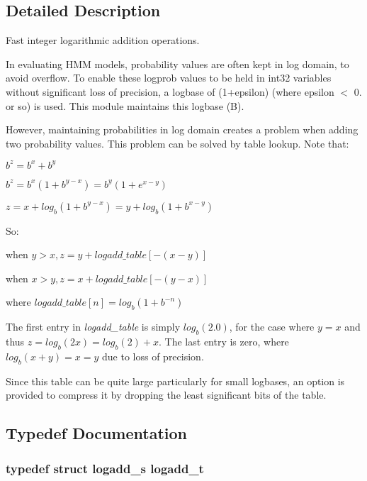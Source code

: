 \subsection{Detailed Description}
Fast integer logarithmic addition operations. 

In evaluating H\+M\+M models, probability values are often kept in log domain, to avoid overflow. To enable these logprob values to be held in int32 variables without significant loss of precision, a logbase of (1+epsilon) (where epsilon $<$ 0. or so) is used. This module maintains this logbase (B).

However, maintaining probabilities in log domain creates a problem when adding two probability values. This problem can be solved by table lookup. Note that\+:


\begin{DoxyItemize}
\item $ b^z = b^x + b^y $
\item $ b^z = b^x(1 + b^{y-x}) = b^y(1 + e^{x-y}) $
\item $ z = x + log_b(1 + b^{y-x}) = y + log_b(1 + b^{x-y}) $
\end{DoxyItemize}

So\+:


\begin{DoxyItemize}
\item when $ y > x, z = y + logadd\_table[-(x-y)] $
\item when $ x > y, z = x + logadd\_table[-(y-x)] $
\item where $ logadd\_table[n] = log_b(1 + b^{-n}) $
\end{DoxyItemize}

The first entry in {\itshape logadd\+\_\+table} is simply $ log_b(2.0) $, for the case where $ y = x $ and thus $ z = log_b(2x) = log_b(2) + x $. The last entry is zero, where $ log_b(x+y) = x = y $ due to loss of precision.

Since this table can be quite large particularly for small logbases, an option is provided to compress it by dropping the least significant bits of the table. 

\subsection{Typedef Documentation}
\subsubsection[{logadd\+\_\+t}]{\setlength{\rightskip}{0pt plus 5cm}typedef struct {\bf logadd\+\_\+s} {\bf logadd\+\_\+t}}\label{logmath_8h_a8c04c94e2c6364f6cf3b649eb4ce5bfd}


